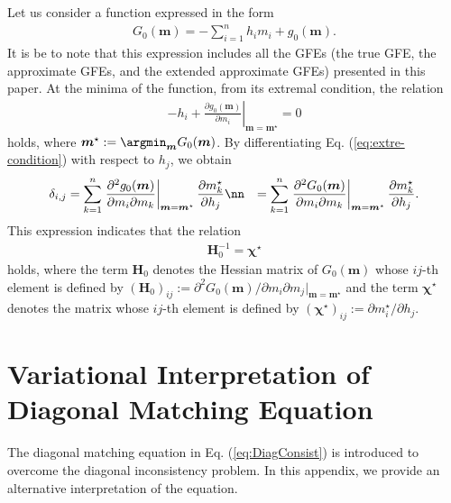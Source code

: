 \documentclass[%
 reprint,
 amsmath,amssymb,
 aps, 
 pre,
 showkeys
]{revtex4-1}
\begin{document}
Let us consider a function expressed in the form
\begin{align*}
G_0(\bm{m}) = -  \sum_{i=1}^n h_i m_i + g_0(\bm{m}).
\end{align*}
It is be to note that this expression includes all the GFEs (the true GFE, the approximate GFEs, and the extended approximate GFEs) presented in this paper.
At the minima of the function, from its extremal condition, the relation
\begin{align}
- h_i + \left. \frac{\partial g_0(\bm{m})}{\partial m_i} \right|_{\bm{m} = \bm{m}^{\star}} = 0
\label{eq:extre-condition}
\end{align}
holds, where $\bm{m}^{\star}:= \argmin_{\bm{m}} G_0(\bm{m})$. 
By differentiating Eq. (\ref{eq:extre-condition}) with respect to $h_j$, we obtain
\begin{align*}
\delta_{i,j} &=  \sum_{k=1}^n\left. \frac{\partial^2 g_0(\bm{m})}{\partial m_i \partial m_k} \right|_{\bm{m} = \bm{m}^{\star}} \frac{\partial m_k^{\star}}{\partial h_j} \nn
&=\sum_{k=1}^n\left. \frac{\partial^2 G_0(\bm{m})}{\partial m_i \partial m_k} \right|_{\bm{m} = \bm{m}^{\star}} \frac{\partial m_k^{\star}}{\partial h_j}.
\end{align*} 
This expression indicates that the relation 
\begin{align}
\bm{H}_0^{-1} = \bm{\chi}^{\star}
\label{eq:LRR-app}
\end{align}
holds, where the term $\bm{H}_0$ denotes the Hessian matrix of $G_0(\bm{m})$ whose $ij$-th element is defined by 
$(\bm{H}_0)_{ij} := \partial^2 G_0(\bm{m})/\partial m_i \partial m_j |_{\bm{m} = \bm{m}^{\star}}$ 
and the term $\bm{\chi}^{\star}$ denotes the matrix whose $ij$-th element is defined by
$(\bm{\chi}^{\star})_{ij} := \partial m_i^{\star}/\partial h_j$.

\section{Variational Interpretation of Diagonal Matching Equation} \label{app:review-DME}

The diagonal matching equation in Eq. (\ref{eq:DiagConsist}) is introduced to overcome the diagonal inconsistency problem. 
In this appendix, we provide an alternative interpretation of the equation.
\end{document}
